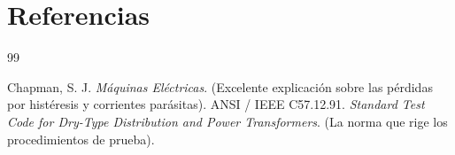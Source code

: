 \section{Referencias}

\begin{thebibliography}{99}

Chapman, S. J. \textit{Máquinas Eléctricas}. (Excelente explicación sobre las pérdidas por histéresis y corrientes parásitas).
ANSI / IEEE C57.12.91. \textit{Standard Test Code for Dry-Type Distribution and Power Transformers}. (La norma que rige los procedimientos de prueba).


\end{thebibliography}
